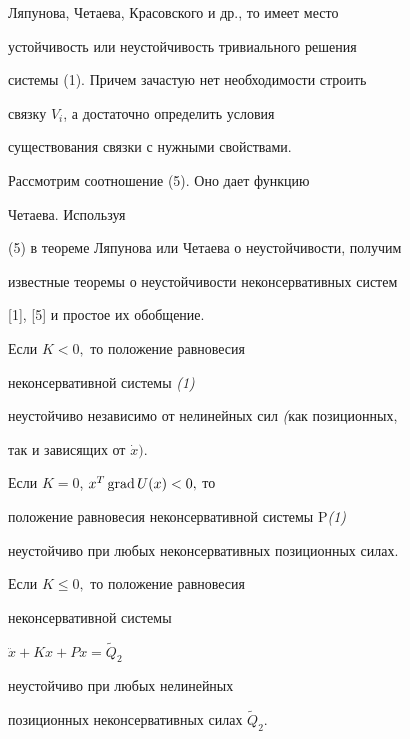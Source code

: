Ляпунова, Четаева, Красовского и др., то имеет место


устойчивость или неустойчивость тривиального решения


системы (1). Причем зачастую нет необходимости строить


связку $V_{i}$, а достаточно определить условия


существования связки с нужными свойствами.





Рассмотрим соотношение (5). Оно дает функцию


Четаева. Используя


(5) в теореме Ляпунова или Четаева о неустойчивости, получим


известные теоремы о неустойчивости неконсервативных систем


[1], [5] и простое их обобщение.





\begin{thm} Если $K<0,$ то положение равновесия


неконсервативной системы {\em (1)}


неустойчиво независимо от нелинейных сил {\em (}как позиционных,


так и зависящих от $ \Dot x)$.


\end{thm}





\begin{thm} Если $K=0$, $x^{T}\operatorname{grad} U(x)<0,$ то


положение равновесия неконсервативной системы P{\em (1)}


неустойчиво при любых неконсервативных позиционных силах.


\end{thm}





\begin{thm} Если $K \le 0,$ то положение равновесия


неконсервативной системы


$\ddot x + Kx+Px=\widetilde{Q}_{2}$


неустойчиво при любых нелинейных


позиционных неконсервативных силах $\widetilde{Q}_{2}.$


\end{thm}






